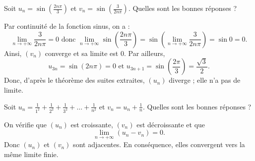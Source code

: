 \begin{question}

Soit $\displaystyle u_n=\sin\left(\frac{2n\pi}{3}\right)$ et $\displaystyle v_n=\sin\left(\frac{3}{2n\pi}\right)$. Quelles sont les bonnes réponses ?
\begin{answers}  
\end{answers}
\begin{explanations}
Par continuité de la fonction sinus, on a :
$$\displaystyle \lim _{n\to +\infty}\frac{3}{2n\pi}=0\mbox{ donc }\displaystyle \lim _{n\to +\infty}\sin\left(\frac{2n\pi}{3}\right)=\sin\left(\lim _{n\to +\infty}\frac{3}{2n\pi}\right)=\sin 0=0.$$
Ainsi, $(v_n)$ converge et sa limite est $0$. Par ailleurs, $$u_{3n}=\sin (2n\pi)=0\mbox{ et }u_{3n+1}=\sin \left(\frac{2\pi}{3}\right)=\frac{\sqrt{3}}{2}.$$
Donc, d'après le théorème des suites extraites, $(u_n)$ diverge ; elle n'a pas de limite.
\end{explanations}
\end{question}



\begin{question}

Soit $\displaystyle u_n=\frac{1}{1^2}+\frac{1}{2^2}+\frac{1}{3^2}+\dots+\frac{1}{n^2}$ et $\displaystyle v_n=u_n+\frac{1}{n}$. Quelles sont les bonnes réponses ?
\begin{answers}  
\end{answers}
\begin{explanations}
On vérifie que $(u_n)$ est croissante, $(v_n)$ est décroissante et que 
$$\displaystyle \lim _{n\to +\infty}(u_n-v_n)=0.$$
Donc $(u_n)$ et $(v_n)$ sont adjacentes. En conséquence, elles convergent vers la même limite finie.
\end{explanations}
\end{question}


